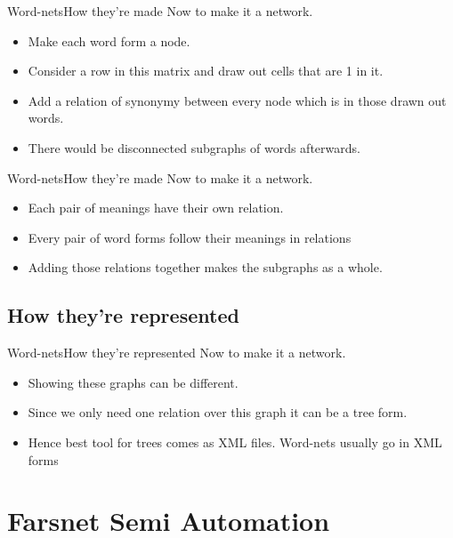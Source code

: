 \documentclass{beamer}
\begin{document}
\begin{frame}{Word-nets}{How they're made}
	Now to make it a network.
	\begin{itemize}
		\item<1-> {
				Make each word form a node.
			}
		\item<2-> {
				Consider a row in this matrix and draw out cells that are 1 in it.
			}
		\item<3->{
				Add a relation of synonymy between every node which is in those drawn out words. 	
			}
		\item<3->{
				There would be disconnected subgraphs of words afterwards.
			}
	\end{itemize}
\end{frame}

\begin{frame}{Word-nets}{How they're made}
	Now to make it a network.
	\begin{itemize}
		\item<1-> {
				Each pair of meanings have their own relation.
			}
		\item<2-> {
				Every pair of word forms follow their meanings in relations
			}
		\item<3->{
				Adding those relations together makes the subgraphs as a whole.	
			}
	\end{itemize}
\end{frame}

\subsection{How they're represented}

\begin{frame}{Word-nets}{How they're represented}
	Now to make it a network.
	\begin{itemize}
		\item<1-> {
				Showing these graphs can be different.
			}
		\item<2-> {
				Since we only need one relation over this graph it can be a tree form.
			}
		\item<3->{
				Hence best tool for trees comes as XML files. Word-nets usually go in XML forms
			}
	
	\end{itemize}
\end{frame}

\section{Farsnet Semi Automation}
\end{document}
